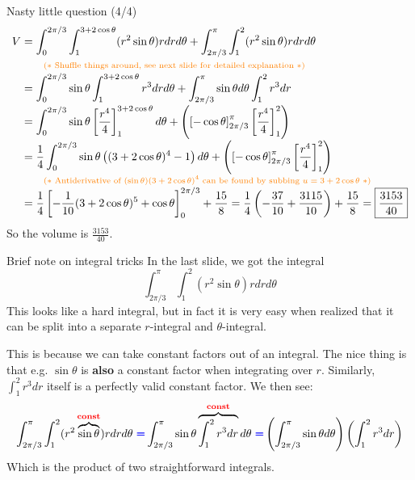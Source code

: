 \begin{frame}{Nasty little question (4/4)}
    \footnotesize
    \begin{align*}
        V&=\int_0^{2\pi/3}\int_1^{3+2\cos\theta}(r^2\sin\theta)rdrd\theta+\int_{2\pi/3}^{\pi}\int_{1}^2(r^2\sin\theta) rdrd\theta\\[-1mm]
         &\qquad\textcolor{orange}{\text{\scriptsize ($*$ Shuffle things around, see next slide for detailed explanation $*$)}}\\[-1mm]
         &=\int_0^{2\pi/3}\sin\theta\int_1^{3+2\cos\theta}r^3drd\theta+\int_{2\pi/3}^{\pi}\sin\theta d\theta\int_{1}^2r^3 dr\\[-1mm]
         &=\int_0^{2\pi/3}\sin\theta\left[\frac{r^4}{4}\right]_1^{3+2\cos\theta}d\theta+\left(\left[-\cos\theta\right]_{2\pi/3}^{\pi} \left[\frac{r^4}{4}\right]_1^2\right)\\[-1mm]
         &=\frac{1}{4}\int_0^{2\pi/3}\sin\theta\left((3+2\cos\theta)^4-1\right)d\theta+\left(\left[-\cos\theta\right]_{2\pi/3}^{\pi} \left[\frac{r^4}{4}\right]_1^2\right)\\[-1mm]
         &\qquad\textcolor{orange}{\text{\scriptsize ($*$ Antiderivative of $(\sin\theta)(3+2\cos\theta)^4$ can be found by subbing $u=3+2\cos\theta$ $*$)}}\\[-1mm]
         &=\frac{1}{4}\left[-\frac{1}{10}(3+2\cos\theta)^5+\cos\theta\right]_0^{2\pi/3}+\frac{15}{8}=\frac{1}{4}\left(-\frac{37}{10}+\frac{3115}{10}\right)+\frac{15}{8}=\boxed{\frac{3153}{40}}\\
    \end{align*}
    So the volume is $\frac{3153}{40}$.
\end{frame}

\begin{frame}{Brief note on integral tricks}\label{integraltrick}
    In the last slide, we got the integral \[\int_{2\pi/3}^{\pi}\int_{1}^2(r^2\sin\theta) rdrd\theta\] This looks like a hard integral, but in fact it is very easy when realized that it can be split into a separate $r$-integral and $\theta$-integral.

    This is because we can take constant factors out of an integral. The nice thing is that e.g. $\sin\theta$ is \textbf{also} a constant factor when integrating over $r$. Similarly, $\int_1^2 r^3 dr$ itself is a perfectly valid constant factor. We then see:
    {\footnotesize
    \[\int_{2\pi/3}^{\pi}\int_{1}^2(r^2\overbrace{\sin\theta}^{\textcolor{red}{\textbf{const}}}) rdrd\theta \textcolor{blue}{~\pmb{=}} \int_{2\pi/3}^{\pi}\sin\theta\overbrace{\int_{1}^2r^3 dr}^{\textcolor{red}{\textbf{const}}}d\theta \textcolor{blue}{~\pmb{=}} \left(\int_{2\pi/3}^{\pi}\sin\theta d\theta\right)\left(\int_1^2r^3dr\right)\]}
    Which is the product of two straightforward integrals.
\end{frame}

